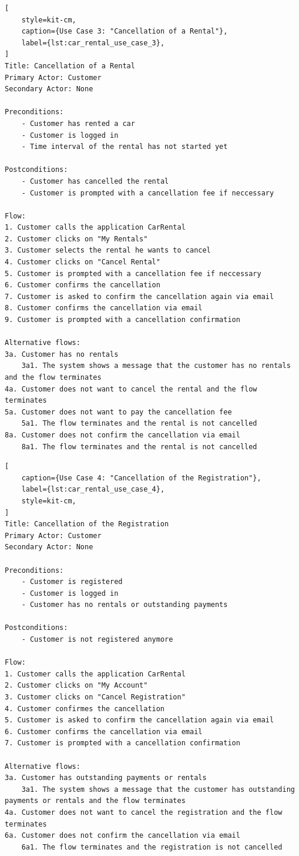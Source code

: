 \begin{lstlisting}[
    style=kit-cm,
    caption={Use Case 3: "Cancellation of a Rental"},
    label={lst:car_rental_use_case_3},
]
Title: Cancellation of a Rental
Primary Actor: Customer
Secondary Actor: None

Preconditions:
    - Customer has rented a car
    - Customer is logged in
    - Time interval of the rental has not started yet

Postconditions:
    - Customer has cancelled the rental
    - Customer is prompted with a cancellation fee if neccessary

Flow:
1. Customer calls the application CarRental
2. Customer clicks on "My Rentals"
3. Customer selects the rental he wants to cancel
4. Customer clicks on "Cancel Rental"
5. Customer is prompted with a cancellation fee if neccessary
6. Customer confirms the cancellation
7. Customer is asked to confirm the cancellation again via email
8. Customer confirms the cancellation via email
9. Customer is prompted with a cancellation confirmation

Alternative flows:
3a. Customer has no rentals
    3a1. The system shows a message that the customer has no rentals and the flow terminates
4a. Customer does not want to cancel the rental and the flow terminates
5a. Customer does not want to pay the cancellation fee
    5a1. The flow terminates and the rental is not cancelled
8a. Customer does not confirm the cancellation via email
    8a1. The flow terminates and the rental is not cancelled
\end{lstlisting}

\begin{lstlisting}[
    caption={Use Case 4: "Cancellation of the Registration"},
    label={lst:car_rental_use_case_4},
    style=kit-cm,
]
Title: Cancellation of the Registration
Primary Actor: Customer
Secondary Actor: None

Preconditions:
    - Customer is registered
    - Customer is logged in
    - Customer has no rentals or outstanding payments

Postconditions:
    - Customer is not registered anymore

Flow:
1. Customer calls the application CarRental
2. Customer clicks on "My Account"
3. Customer clicks on "Cancel Registration"
4. Customer confirmes the cancellation
5. Customer is asked to confirm the cancellation again via email
6. Customer confirms the cancellation via email
7. Customer is prompted with a cancellation confirmation

Alternative flows:
3a. Customer has outstanding payments or rentals
    3a1. The system shows a message that the customer has outstanding payments or rentals and the flow terminates
4a. Customer does not want to cancel the registration and the flow terminates
6a. Customer does not confirm the cancellation via email
    6a1. The flow terminates and the registration is not cancelled
\end{lstlisting}


